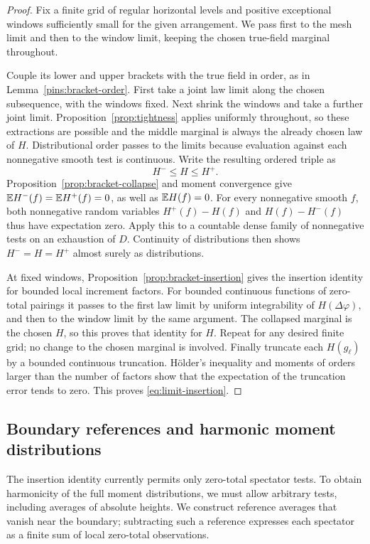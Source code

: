 \begin{proof}
Fix a finite grid of regular horizontal levels and positive exceptional
windows sufficiently small for the given arrangement.  We pass first
to the mesh limit and then to the window limit, keeping the chosen
true-field marginal throughout.

Couple its lower and upper brackets with the true field in order,
as in Lemma~\ref{pins:bracket-order}.  First take a joint law limit
along the chosen subsequence, with the windows fixed.  Next shrink
the windows and take a further joint limit.  Proposition~\ref{prop:tightness}
applies uniformly throughout, so these extractions are possible and
the middle marginal is always the already chosen law of \(H\).
Distributional order passes to the limits because evaluation against
each nonnegative smooth test is continuous.  Write the resulting
ordered triple as
\[
       H^-\le H\le H^+.
\]
Proposition~\ref{prop:bracket-collapse} and moment convergence give
\(\mathbb E H^-(f)=\mathbb E H^+(f)=0\), as well as \(\mathbb E H(f)=0\).
For every nonnegative smooth \(f\), both nonnegative random variables
\(H^+(f)-H(f)\) and \(H(f)-H^-(f)\) thus have expectation zero.
Apply this to a countable dense family of nonnegative tests on an
exhaustion of \(D\).  Continuity of distributions then shows
\(H^-=H=H^+\) almost surely as distributions.

At fixed windows, Proposition~\ref{prop:bracket-insertion} gives the
insertion identity for bounded local increment factors.  For bounded
continuous functions of zero-total pairings it passes to the first
law limit by uniform integrability of \(H(\Delta\varphi)\), and then
to the window limit by the same argument.  The collapsed marginal is
the chosen \(H\), so this proves that identity for \(H\).
Repeat for any desired finite grid; no change to the chosen marginal
is involved.  Finally truncate each \(H(g_\ell)\) by a bounded
continuous truncation.  H\"older's inequality and moments of orders
larger than the number of factors show that the expectation of the
truncation error tends to zero.  This proves
\eqref{eq:limit-insertion}.
\end{proof}

\subsection{Boundary references and harmonic moment distributions}

The insertion identity currently permits only zero-total spectator
tests.  To obtain harmonicity of the full moment distributions, we
must allow arbitrary tests, including averages of absolute heights.
We construct reference averages that vanish near the boundary;
subtracting such a reference expresses each spectator as a finite
sum of local zero-total observations.

